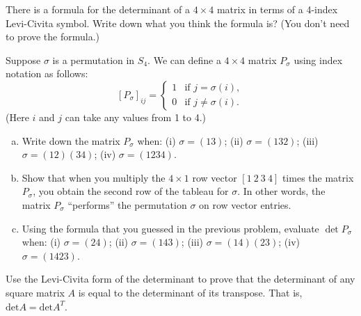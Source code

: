 \begin{exercise}{}
There is a formula for the determinant of a $4 \times 4$  matrix in terms of a 4-index Levi-Civita symbol. Write down what you think the formula is? (You don't need to prove the formula.)
\end{exercise}

\begin{exercise}{}
Suppose $\sigma$ is a permutation in $S_4$. We can define a $4 \times 4$ matrix $P_{\sigma}$ using index notation as follows:  
\[ [P_{\sigma}]_{ij} = \begin{cases} 1 &\mbox{if } j = \sigma(i), \\ 
 0 &\mbox{if } j \neq  \sigma(i).  \end{cases} \]
(Here $i$ and $j$ can take any values from 1 to 4.)  
\begin{enumerate}[(a)]
\item
Write down the matrix $P_{\sigma}$ when: (i) $\sigma = (13)$; (ii) $\sigma = (132)$; (iii) $\sigma = (12)(34)$; (iv)  $\sigma = (1234)$.
\item
Show that when you multiply the $4 \times 1$ row vector $[1~2~3~4]$ times the matrix $P_{\sigma}$, you obtain the second row of the tableau for $\sigma$.  In other words, the matrix $P_{\sigma}$ ``performs'' the permutation $\sigma$ on row vector entries.
\item
Using the formula that you guessed in the previous problem, evaluate $\det P_{\sigma}$ when: (i) $\sigma = (24)$; (ii) $\sigma = (143)$; (iii) $\sigma = (14)(23)$; (iv)  $\sigma = (1423)$.
\end{enumerate}
\end{exercise}

\begin{exercise}{}
Use the Levi-Civita form of the determinant to prove that the determinant of any square matrix $A$ is equal to the determinant of its transpose.  That is, $\text{det} A = \text{det}A^{T}$.
\end{exercise}

